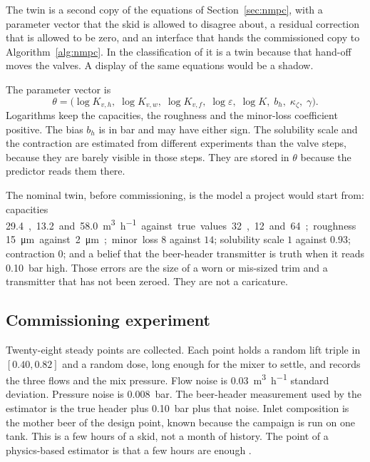The twin is a second copy of the equations of Section~\ref{sec:nmpc}, with a parameter vector that the skid is allowed to disagree about, a residual correction that is allowed to be zero, and an interface that hands the commissioned copy to Algorithm~\ref{alg:nmpc}. In the classification of \citet{kritzinger2018} it is a twin because that hand-off moves the valves. A display of the same equations would be a shadow.

The parameter vector is
\begin{equation}
\label{eq:theta}
\theta
=
\big(
\log K_{v,h},\;
\log K_{v,w},\;
\log K_{v,f},\;
\log \varepsilon,\;
\log K,\;
b_h,\;
\kappa_{\zeta},\;
\gamma
\big).
\end{equation}
Logarithms keep the capacities, the roughness and the minor-loss coefficient positive. The bias $b_h$ is in bar and may have either sign. The solubility scale and the contraction are estimated from different experiments than the valve steps, because they are barely visible in those steps. They are stored in $\theta$ because the predictor reads them there.

The nominal twin, before commissioning, is the model a project would start from: capacities \SI{29.4}, \SI{13.2} and \SI{58.0}{\cubic\metre\per\hour} against true values \SI{32}, \SI{12} and \SI{64}; roughness \SI{15}{\micro\metre} against \SI{2}{\micro\metre}; minor loss $8$ against $14$; solubility scale $1$ against $0.93$; contraction $0$; and a belief that the beer-header transmitter is truth when it reads \SI{0.10}{bar} high. Those errors are the size of a worn or mis-sized trim and a transmitter that has not been zeroed. They are not a caricature.

\subsection{Commissioning experiment}

Twenty-eight steady points are collected. Each point holds a random lift triple in $[0.40,0.82]$ and a random dose, long enough for the mixer to settle, and records the three flows and the mix pressure. Flow noise is \SI{0.03}{\cubic\metre\per\hour} standard deviation. Pressure noise is \SI{0.008}{bar}. The beer-header measurement used by the estimator is the true header plus \SI{0.10}{bar} plus that noise. Inlet composition is the mother beer of the design point, known because the campaign is run on one tank. This is a few hours of a skid, not a month of history. The point of a physics-based estimator is that a few hours are enough \citep{zheng2023,kadlec2009}.

